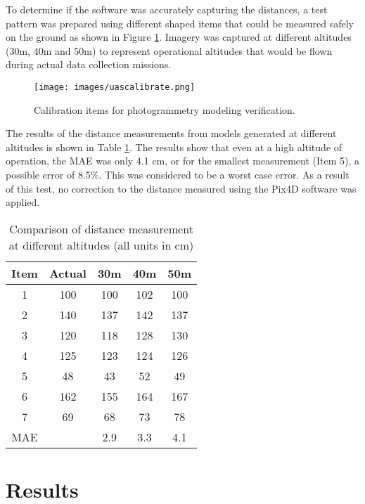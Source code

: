 \documentclass[preprint,12pt,a4paper,authoryear]{elsarticle}
\begin{document}
\begin{linenumbers}
To determine if the software was accurately capturing the distances, a test pattern was prepared using different shaped items that could be measured safely on the ground as shown in Figure \ref{fig:uascalibration}. Imagery was captured at different altitudes (30m, 40m and 50m) to represent operational altitudes that would be flown during actual data collection missions.

\begin{figure}[H]
\texttt{[image: images/uascalibrate.png]} 
\caption{Calibration items for photogrammetry modeling verification.}
\label{fig:uascalibration}
\end{figure}

The results of the distance measurements from models generated at different altitudes is shown in Table \ref{tab:uascalibrate}. The results show that even at a high altitude of operation, the MAE was only 4.1 cm, or for the smallest measurement (Item 5), a possible error of 8.5\%. This was considered to be a worst case error. As a result of this test, no correction to the distance measured using the Pix4D software was applied.

%
\begin{table}[H]
\centering
\caption[Comparison of distance measurement at different altitudes]{Comparison of distance measurement at different altitudes (all units in cm)}
\label{tab:uascalibrate}
\begin{tabular}{@{}ccccc@{}}
\toprule
\textbf{Item} & \textbf{Actual} & \textbf{30m} & \textbf{40m} & \textbf{50m} \\ \midrule
1 & 100 & 100 & 102 & 100 \\
2 & 140 & 137 & 142 & 137 \\
3 & 120 & 118 & 128 & 130 \\
4 & 125 & 123 & 124 & 126 \\
5 & 48 & 43 & 52 & 49 \\
6 & 162 & 155 & 164 & 167 \\
7 & 69 & 68 & 73 & 78 \\
MAE &  & 2.9 & 3.3 & 4.1 \\ \bottomrule
\end{tabular}
\end{table}


\section{Results}

\end{linenumbers}
\end{document}
